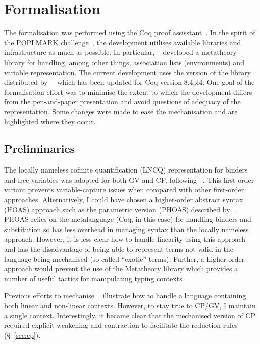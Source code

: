 \section{Formalisation}

The formalisation was performed using the Coq proof
assisstant~\cite{Coq:manual}. In the spirit of the POPLMARK
challenge~\cite{Aydemir:2005:MMM}, the development utilises available
libraries and infrastructure as much as possible. In particular,
\citeauthor{Aydemir:2008:EFM}~\cite{Aydemir:2008:EFM} developed a metatheory
library for handling, among other things, association lists (environments) and
variable representation. The current development uses the version of the
library distributed by~\citeauthor{Park:2014:MMW}~\cite{Park:2014:MMW} which
has been updated for Coq version 8.4pl4. One goal of the formalisation effort
was to minimise the extent to which the development differs from the
pen-and-paper presentation and avoid questions of adequacy of the
representation. Some changes were made to ease the mechanisation and are
highlighted where they occur.

\subsection{Preliminaries}\label{sec:approach}

The locally nameless cofinite quantification (LNCQ) representation for binders
and free variables was adopted for both GV and CP, following
\citeauthor{Aydemir:2008:EFM}~\cite{Aydemir:2008:EFM}. This first-order
variant prevents variable-capture issues when compared with other first-order
approaches. Alternatively, I could have chosen a higher-order abstract syntax
(HOAS) approach such as the parametric version (PHOAS) described
by~\citeauthor{Chlipala:2008:PHOAS}~\cite{Chlipala:2008:PHOAS}. PHOAS relies
on the metalanguage (Coq, in this case) for handling binders and substitution
so has less overhead in managing syntax than the locally nameless
approach. However, it is less clear how to handle linearity using this
approach and has the disadvantage of being able to represent terms not valid
in the language being mechanised (so called ``exotic'' terms). Further, a
higher-order approach would prevent the use of the Metatheory library which
provides a number of useful tactics for manipulating typing contexts.

Previous efforts to mechanise \fpop~\cite{Park:2014:MMW} illustrate how to
handle a language containing both linear and non-linear contexts. However, to
stay true to CP/GV, I maintain a single context. Interestingly, it became
clear that the mechanised version of CP required explicit weakening and
contraction to facilitate the reduction rules (\S~\ref{sec:cp}).

